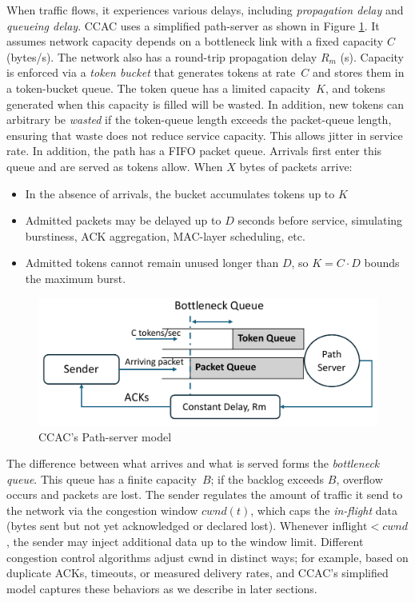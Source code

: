 \documentclass[12pt]{l4dc2023}
\begin{document}
When traffic flows, it experiences various delays, including \emph{propagation delay} and \emph{queueing delay}. CCAC uses a simplified path-server as shown in Figure \ref{fig:tb}. It assumes network capacity depends on a bottleneck link with a fixed capacity $C$ (bytes/s).  
The network also has a round-trip propagation delay $R_{m}$ (s). Capacity is enforced via a \emph{token bucket} that generates tokens at rate~$C$ and stores them in a token-bucket queue. The token queue has a limited capacity~$K$, and tokens generated when this capacity is filled will be wasted. In addition, new tokens can arbitrary be \emph{wasted} if the token-queue length exceeds the packet-queue length, ensuring that waste does not reduce service capacity. This allows jitter in service rate. In addition, the path has a FIFO packet queue. Arrivals first enter this queue and are served as tokens allow. When $X$ bytes of packets arrive:

\begin{itemize}
  \item In the absence of arrivals, the bucket accumulates tokens up to $K$
  \item Admitted packets may be delayed up to $D$ seconds before service, simulating burstiness, ACK aggregation, MAC-layer scheduling, etc.
  \item Admitted tokens cannot remain unused longer than $D$, so $K=C\cdot D$ bounds the maximum burst.
\end{itemize}

\begin{figure}[htbp]
    \centering
    \includegraphics[width=0.75\linewidth]{tb.pdf}
    \caption{CCAC's Path-server model}
    \label{fig:tb}
\end{figure}

The difference between what arrives and what is served forms the \emph{bottleneck queue}. This queue has a finite capacity~$B$; if the backlog exceeds $B$, overflow occurs and packets are lost. The sender regulates the amount of traffic it send to the network via the congestion window $cwnd(t)$, which caps the \emph{in-flight} data (bytes sent but not yet acknowledged or declared lost). Whenever $\mathrm{inflight}<cwnd$, the sender may inject additional data up to the window limit. Different congestion control algorithms adjust $\mathrm{cwnd}$ in distinct ways; for example, based on duplicate ACKs, timeouts, or measured delivery rates, and CCAC's simplified model captures these behaviors as we describe in later sections. 
\end{document}
